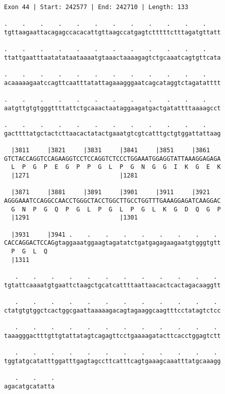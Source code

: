 \documentclass{article}
\begin{document}
\begin{Verbatim}[fontfamily=courier]
Exon 44 | Start: 242577 | End: 242710 | Length: 133

.    .    .    .    .    .    .    .    .    .    .    .    
tgttaagaattacagagccacacattgttaagccatgagtctttttctttagatgttatt

.    .    .    .    .    .    .    .    .    .    .    .    
ttattgaatttaatatataataaaatgtaaactaaaagagtctgcaaatcagtgttcata

.    .    .    .    .    .    .    .    .    .    .    .    
acaaaaagaatccagttcaatttatattagaaagggaatcagcataggtctagatatttt

.    .    .    .    .    .    .    .    .    .    .    .    
aatgttgtgtgggttttattctgcaaactaataggaagatgactgatattttaaaagcct

.    .    .    .    .    .    .    .    .    .    .    .    
gacttttatgctactcttaacactatactgaaatgtcgtcatttgctgtggattattaag

  |3811     |3821     |3831     |3841     |3851     |3861   
GTCTACCAGGTCCAGAAGGTCCTCCAGGTCTCCCTGGAAATGGAGGTATTAAAGGAGAGA
  L  P  G  P  E  G  P  P  G  L  P  G  N  G  G  I  K  G  E  K
  |1271                         |1281                       

  |3871     |3881     |3891     |3901     |3911     |3921   
AGGGAAATCCAGGCCAACCTGGGCTACCTGGCTTGCCTGGTTTGAAAGGAGATCAAGGAC
  G  N  P  G  Q  P  G  L  P  G  L  P  G  L  K  G  D  Q  G  P
  |1291                         |1301                       

  |3931     |3941 .    .    .    .    .    .    .    .    . 
CACCAGGACTCCAGgtaggaaatggaagtagatatctgatgagagaagaatgtgggtgtt
  P  G  L  Q                                                
  |1311                                                     

   .    .    .    .    .    .    .    .    .    .    .    . 
tgtattcaaaatgtgaattctaagctgcatcattttaattaacactcactagacaaggtt

   .    .    .    .    .    .    .    .    .    .    .    . 
ctatgtgtggctcactggcgaattaaaaagacagtagaaggcaagtttcctatagtctcc

   .    .    .    .    .    .    .    .    .    .    .    . 
taaagggactttgttgtattatagtcagagttcctgaaaagatacttcacctggagtctt

   .    .    .    .    .    .    .    .    .    .    .    . 
tggtatgcatatttggatttgagtagccttcatttcagtgaaagcaaatttatgcaaagg

   .    .    .
agacatgcatatta
\end{Verbatim}
\newpage
\end{document}
